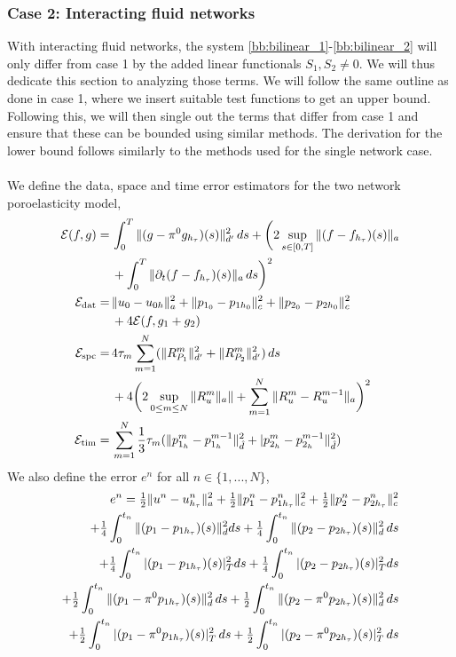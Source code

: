 \subsubsection{Case 2: Interacting fluid networks} 
With interacting fluid networks, the system \eqref{bb:bilinear_1}-\eqref{bb:bilinear_2} will only differ from case 1 by the added linear functionals $S_1, S_2 \neq 0$. We will thus dedicate this section to analyzing those terms. We will follow the same outline as done in case 1, where we insert suitable test functions to get an upper bound. Following this, we will then single out the terms that differ from case 1 and ensure that these can be bounded using similar methods. The derivation for the lower bound follows similarly to the methods used for the single network case. 
\\
\\
We define the data, space and time error estimators for the two network poroelasticity model,
\begin{align} 
\mathcal{E}(f,g) = & \, \int_0^{T}  \|(g-\pi^0 g_{h_\tau})(s)\|^2_{d'} \, ds + \biggl( 2 \sup_{s \in [0,T]} \| (f - f_{h_\tau})(s)\|_a \\
& \, + \int_0^{T} \| \partial_t (f - f_{h_\tau})(s)\|_a \, ds \biggr)^2 \notag \\
\mathcal{E}_{\textnormal{dat}} = & \, \|u_0 - u_{0 h} \|^2_a + \|p_{1_0} - p_{1h_0} \|^2_c + \|p_{2_0} - p_{2h_0} \|^2_c \\
& \, + 4\mathcal{E}(f, g_1 + g_2) \notag \\
\mathcal{E}_{\textnormal{spc}} = & \, 4 \tau_m\sum_{m=1}^N ( \| R_{P_1}^m\|^2_{d'} + \| R_{P_2}^m\|^2_{d'}) \, ds \\
& \, + 4\biggl(2 \sup_{0 \leq m \leq N} \| R_u^m\|_a\| + \sum_{m=1}^N \| R_u^m - R_u^{m-1}\|_a \biggr)^2 \notag \\
\mathcal{E}_{\textnormal{tim}} = & \,\sum_{m=1}^N \frac{1}{3}\tau_m (\|p^m_{1_h} - p^{m-1}_{1_h}\|_{\hat{d}}^2 + |p^m_{2_h} - p^{m-1}_{2_h}\|_{\hat{d}}^2) 
\end{align}
We also define the error $e^n$ for all $n \in \{1,...,N \}$,
\begin{align} \label{mpet:total_error}
e^n = \tfrac{1}{2}\|u^n - u^n_{h_\tau} \|^2_a + \tfrac{1}{2}\|p_1^n - p^n_{1h_\tau} \|^2_c
+ \tfrac{1}{2}\|p_2^n - p^n_{2h_\tau} \|^2_c \\ \notag
+ \tfrac{1}{4}\int_0^{t_n} \|(p_1 - p_{1h_\tau})(s) \|^2_d ds + \tfrac{1}{4}\int_0^{t_n} \|(p_2 - p_{2h_\tau})(s) \|^2_d \, ds \notag\\ 
+ \tfrac{1}{4}\int_0^{t_n} |(p_1-p_{1h_\tau})(s)|_T^2 ds\notag 
+ \tfrac{1}{4}\int_0^{t_n} |(p_2-p_{2h_\tau})(s)|_T^2 ds \notag \\ 
+ \tfrac{1}{2}\int_0^{t_n} \|(p_1 - \pi^0p_{1h_\tau})(s) \|^2_d \, ds
+ \tfrac{1}{2}\int_0^{t_n} \|(p_2 - \pi^0p_{2h_\tau})(s) \|^2_d \, ds  \notag \\
+ \tfrac{1}{2}\int_0^{t_n} |(p_1 - \pi^0p_{1h_\tau})(s) |^2_T \, ds + \tfrac{1}{2}\int_0^{t_n} |(p_2 - \pi^0p_{2h_\tau})(s) |^2_T \, ds \notag
\end{align}
